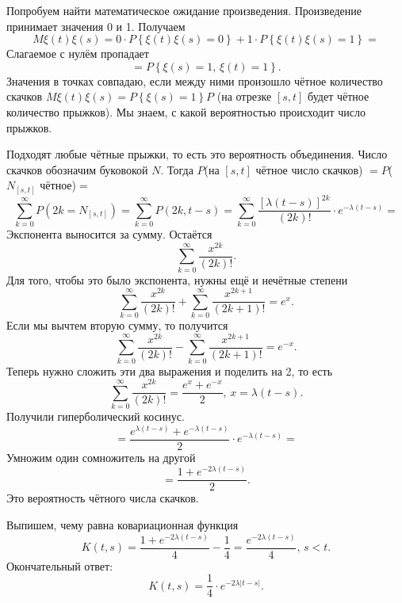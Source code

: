 Попробуем найти математическое ожидание произведения.
Произведение принимает значения 0 и 1.
Получаем
$$M \xi \left( t \right) \xi \left( s \right) =
  0 \cdot P \left\{ \xi \left( t \right) \xi \left( s \right) = 0 \right\} +
  1 \cdot P \left\{ \xi \left( t \right) \xi \left( s \right) = 1 \right\} =$$
Слагаемое с нулём пропадает
$$= P \left\{ \xi \left( s \right) = 1, \, \xi \left( t \right) = 1 \right\}.$$
Значения в точках совпадаю, если между ними произошло чётное количество скачков
$M \xi \left( t \right) \xi \left( s \right) = P \left\{ \xi \left( s \right) = 1 \right\} P$
(на отрезке $ \left[ s, t \right] $ будет чётное количество прыжков).
Мы знаем, с какой вероятностью происходит число прыжков.

Подходят любые чётные прыжки, то есть это вероятность объединения.
Число скачков обозначим буковокой $N$.
Тогда $P$(на $ \left[ s, t \right] $ чётное число скачков)
$= P$($N_{ \left[ s, t \right] }$ чётное)$=$
$$ \sum \limits_{k = 0}^{ \infty } P \left( 2k = N_{ \left[ s, t \right] } \right) =
  \sum \limits_{k = 0}^{ \infty } P \left( 2k, t - s \right) =
  \sum \limits_{k = 0}^{ \infty }
    \frac{ \left[ \lambda \left( t - s \right) \right]^{2k}}{ \left( 2k \right)!} \cdot
    e^{-\lambda \left( t - s \right) } =$$
Экспонента выносится за сумму.
Остаётся
$$ \sum \limits_{k = 0}^{ \infty } \frac{x^{2k}}{ \left( 2k \right)!}.$$
Для того, чтобы это было экспонента, нужны ещё и нечётные степени
$$ \sum \limits_{k = 0}^{ \infty } \frac{x^{2k}}{ \left( 2k \right)!} +
  \sum \limits_{k = 0}^{ \infty } \frac{x^{2k + 1}}{ \left( 2k + 1 \right)!} =
  e^x.$$
Если мы вычтем вторую сумму, то получится
$$ \sum \limits_{k = 0}^{ \infty } \frac{x^{2k}}{ \left( 2k \right)!} -
  \sum \limits_{k = 0}^{ \infty } \frac{x^{2k + 1}}{ \left( 2k + 1 \right)!} =
  e^{-x}.$$
Теперь нужно сложить эти два выражения и поделить на 2, то есть
$$ \sum \limits_{k = 0}^{ \infty } \frac{x^{2k}}{ \left( 2k \right)!} =
  \frac{e^x + e^{-x}}{2}, \,
  x = \lambda \left( t - s \right).$$
Получили гиперболический косинус.
$$= \frac{e^{ \lambda \left( t - s \right) } +
  e^{-\lambda \left( t- s \right) }}{2} \cdot e^{-\lambda \left( t - s \right) } =$$
Умножим один сомножитель на другой
$$= \frac{1 + e^{-2 \lambda \left( t - s \right) }}{2}.$$
Это вероятность чётного числа скачков.

Выпишем, чему равна ковариационная функция
$$K \left( t, s \right) =
  \frac{1 + e^{-2 \lambda \left( t - s \right) }}{4} - \frac{1}{4} =
  \frac{e^{-2 \lambda \left( t - s \right) }}{4}, \,
  s < t.$$
Окончательный ответ:
$$K \left( t, s \right) =
  \frac{1}{4} \cdot e^{-2 \lambda \left| t - s \right| }.$$

